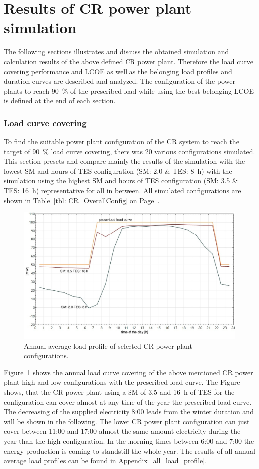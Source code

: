 \section{Results of CR power plant simulation}
The following sections illustrates and discuss the obtained simulation and calculation results of the above defined CR power plant. Therefore the load curve covering performance and LCOE as well as the belonging load profiles and duration curves are described and analyzed. The configuration of the power plants to reach 90~\% of the prescribed load while using the best belonging LCOE is defined at the end of each section.
\subsubsection{Load curve covering}
To find the suitable power plant configuration of the CR system to reach the target of 90~\% load curve covering, there was 20 various configurations simulated. This section presets and compare mainly the results of the simulation with the lowest SM and hours of TES configuration (SM: 2.0 \& TES: \SI{8}{h}) with the simulation using the highest SM and hours of TES configuration (SM: 3.5 \& TES: \SI{16}{h}) representative for all in between. All simulated configurations are shown in Table~\ref{tbl: CR_OverallConfig} on Page~\pageref{tbl: CR_OverallConfig}.

\begin{figure}[htbp]  
\centering
\includegraphics[width=0.8\linewidth]{FIG/CR_annual_profil}
\caption[Annual average load profile of selected CR power plant configurations.]{Annual average load profile of selected CR power plant configurations.}\label{CR_annual_profil}
\end{figure}
Figure~\ref{CR_annual_profil} shows the annual load curve covering of the above mentioned CR power plant high and low configurations with the prescribed load curve. The Figure shows, that the CR power plant using a SM of 3.5 and \SI{16}{h} of TES for the configuration can cover almost at any time of the year the prescribed load curve. The decreasing of the supplied electricity 8:00 leads from the winter duration and will be shown in the following. The lower CR power plant configuration can just cover between 11:00 and 17:00 almost the same amount electricity during the year than the high configuration. In the morning times between 6:00 and 7:00 the energy production is coming to standstill the whole year. The results of all annual average load profiles can be found in Appendix~\ref{all_load_profile}.

